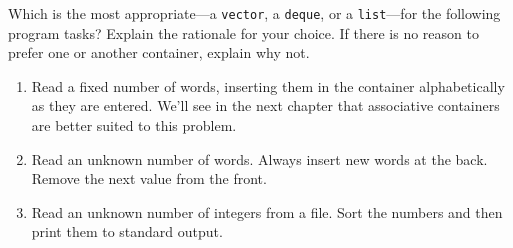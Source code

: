 %
%
\begin{question}
 Which is the most appropriate—a \verb|vector|, a \verb|deque|, or a
\verb|list|—for the following program tasks? Explain the rationale for your choice.
If there is no reason to prefer one or another container, explain why not.
\begin{enumerate}[label=(\alph*)]
^^I\item Read a fixed number of words, inserting them in the container
alphabetically as they are entered. We’ll see in the next chapter that
associative containers are better suited to this problem.
^^I\item Read an unknown number of words. Always insert new words at the
back. Remove the next value from the front.
^^I\item Read an unknown number of integers from a file. Sort the numbers and
then print them to standard output.
\end{enumerate}
\end{question}
